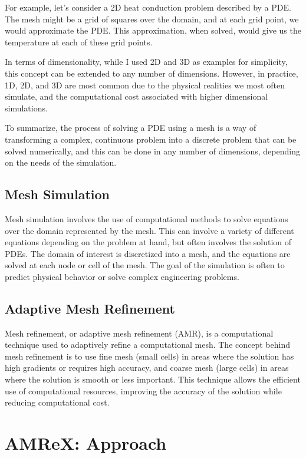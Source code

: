 \documentclass[12pt, a4paper]{scrartcl}
\begin{document}
For example, let's consider a 2D heat conduction problem described by a PDE. The mesh might 
be a grid of squares over the domain, and at each grid point, we would approximate the PDE. 
This approximation, when solved, would give us the temperature at each of these grid points.

In terms of dimensionality, while I used 2D and 3D as examples for simplicity, this concept 
can be extended to any number of dimensions. However, in practice, 1D, 2D, and 3D are most 
common due to the physical realities we most often simulate, and the computational cost 
associated with higher dimensional simulations.

To summarize, the process of solving a PDE using a mesh is a way of transforming a 
complex, continuous problem into a discrete problem that can be solved numerically, and 
this can be done in any number of dimensions, depending on the needs of the simulation.

\subsection{Mesh Simulation}

Mesh simulation involves the use of computational methods to 
solve equations over the domain represented by the mesh. This can involve a variety of 
different equations depending on the problem at hand, but often involves the solution 
of PDEs. The domain of interest is discretized into a mesh, and the equations are 
solved at each node or cell of the mesh. The goal of the simulation is often to predict 
physical behavior or solve complex engineering problems.

\subsection{Adaptive Mesh Refinement}

Mesh refinement, or adaptive mesh refinement (AMR), is 
a computational technique used to adaptively refine a computational mesh. The concept 
behind mesh refinement is to use fine mesh (small cells) in areas where the solution has 
high gradients or requires high accuracy, and coarse mesh (large cells) in areas where 
the solution is smooth or less important. This technique allows the efficient use of 
computational resources, improving the accuracy of the solution while reducing 
computational cost.

\section{AMReX: Approach}
\end{document}
